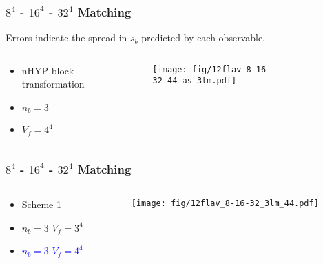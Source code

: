 \begin{frame}
  \frametitle{$8^4$ - $16^4$ - $32^4$ Matching}
  \begin{center}
    Errors indicate the spread in $s_b$ predicted by each observable.
  \end{center}
  \begin{columns}[T]
    \begin{column}{.3\textwidth}
      \begin{block}{}
        \begin{itemize}
          \item nHYP block transformation
          \item $n_b=3$
          \item $V_f=4^4$
        \end{itemize}
      \end{block}
    \end{column}
    \begin{column}{.7\textwidth}
      \begin{block}{}
        \texttt{[image: fig/12flav\_8-16-32\_44\_as\_3lm.pdf]}
      \end{block}
    \end{column}
  \end{columns}
  \begin{center}
  \end{center}
\end{frame}

\begin{frame}
  \frametitle{$8^4$ - $16^4$ - $32^4$ Matching}
  \begin{columns}[T]
    \begin{column}{.3\textwidth}
      \begin{block}{}
        \begin{itemize}
          \item Scheme 1
          \item $n_b=3$ $V_f=3^4$
          \item \textcolor{blue}{$n_b=3$ $V_f=4^4$}
        \end{itemize}
      \end{block}
    \end{column}
    \begin{column}{.7\textwidth}
      \begin{block}{}
        \texttt{[image: fig/12flav\_8-16-32\_3lm\_44.pdf]}
      \end{block}
    \end{column}
  \end{columns}
\end{frame}

